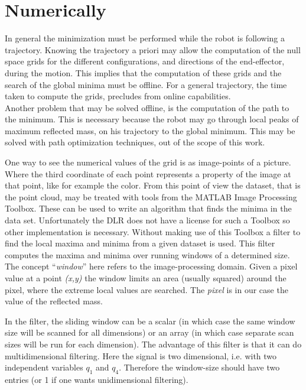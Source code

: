 \section{Numerically}
\label{sec:global_numerical}


In general the minimization must be performed while the robot is following a trajectory. Knowing the trajectory a priori may allow the computation of the null space grids for the different configurations, and directions of the end-effector, during the motion. This implies that the computation of these grids and the search of the global minima must be offline. For a general trajectory, the time taken to compute the grids, precludes from online capabilities.\\
%
Another problem that may be solved offline, is the computation of the path to the minimum. This is necessary because the robot may go through local peaks of maximum reflected mass, on his trajectory to the global minimum. This may be solved with path optimization techniques, out of the scope of this work. 

%
One way to see the numerical values of the grid is as image-points of a picture. Where the third coordinate of each point represents a property of the image at that point, like for example the color. From this point of view the dataset, that is the point cloud, may be treated with tools from the MATLAB Image Processing Toolbox. These can be used to write an algorithm that finds the minima in the data set. Unfortunately the DLR does not have a license for such a Toolbox so other implementation is necessary.
Without making use of this Toolbox a filter \cite{minmaxfilter} to find the local maxima and minima from a given dataset is used. This filter computes the maxima and minima over running windows of a determined size. The concept “\textit{window}” here refers to the image-processing domain. Given a pixel value at a point \textit{(x,y)} the window limits an area (usually squared) around the pixel, where the extreme local values are searched. The \textit{pixel} is in our case  the value of the reflected mass.


In the filter, the sliding window can be a scalar (in which case the same window size will be scanned for all dimensions) or an array (in which case separate scan sizes will be run for each dimension). The advantage of this filter is that it can do multidimensional filtering. Here the signal is two dimensional, i.e. with two independent variables $q_1$ and $q_4$. Therefore the window-size should have two entries (or 1 if one wants unidimensional filtering).


